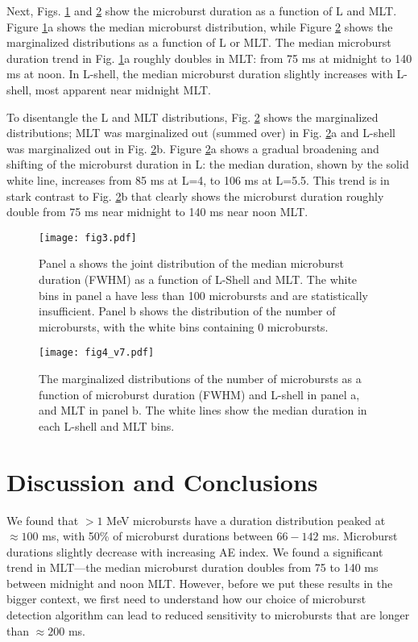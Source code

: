 \documentclass[draft]{agujournal2019}
\begin{document}
Next, Figs. \ref{fig3} and \ref{fig4} show the microburst duration as a function of L and MLT. Figure \ref{fig3}a shows the median microburst distribution, while Figure \ref{fig4} shows the marginalized distributions as a function of L or MLT. The median microburst duration trend in Fig. \ref{fig3}a roughly doubles in MLT: from 75 ms at midnight to 140 ms at noon. In L-shell, the median microburst duration slightly increases with L-shell, most apparent near midnight MLT.

To disentangle the L and MLT distributions, Fig. \ref{fig4} shows the marginalized distributions; MLT was marginalized out (summed over) in Fig. \ref{fig4}a and L-shell was marginalized out in Fig. \ref{fig4}b. Figure \ref{fig4}a shows a gradual broadening and shifting of the microburst duration in L: the median duration, shown by the solid white line, increases from 85 ms at L=4, to 106 ms at L=5.5. This trend is in stark contrast to Fig. \ref{fig4}b that clearly shows the microburst duration roughly double from 75 ms near midnight to 140 ms near noon MLT.

\begin{figure}
\noindent\texttt{[image: fig3.pdf]}
\caption{Panel a shows the joint distribution of the median microburst duration (FWHM) as a function of L-Shell and MLT. The white bins in panel a have less than 100 microbursts and are statistically insufficient. Panel b shows the distribution of the number of microbursts, with the white bins containing 0 microbursts.}
\label{fig3}
\end{figure}

\begin{figure}
\noindent\texttt{[image: fig4\_v7.pdf]}
\caption{The marginalized distributions of the number of microbursts as a function of microburst duration (FWHM) and L-shell in panel a, and MLT in panel b. The white lines show the median duration in each L-shell and MLT bins.}
\label{fig4}
\end{figure}

\section{Discussion and Conclusions}\label{discussion}

We found that $>1$ MeV microbursts have a duration distribution peaked at $\approx 100$ ms, with 50\% of microburst durations between $66-142$ ms. Microburst durations slightly decrease with increasing AE index. We found a significant trend in MLT---the median microburst duration doubles from 75 to 140 ms between midnight and noon MLT. However, before we put these results in the bigger context, we first need to understand how our choice of microburst detection algorithm can lead to reduced sensitivity to microbursts that are longer than $\approx 200$ ms.
\end{document}
